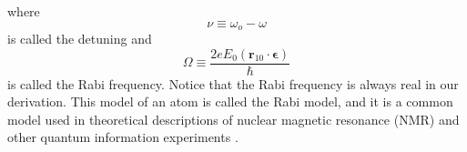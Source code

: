 where
$$
\nu \equiv \omega_o-\omega
$$
is called the detuning and
$$
\Omega \equiv \frac{2eE_0\left(\mathbf{r}_{10}\cdot\mathbf{\epsilon}\right)}{\hbar}
$$
is called the Rabi frequency.  Notice that the Rabi frequency is always real in our derivation.  This model of an atom is called the Rabi model, and it is a common model used in theoretical descriptions of nuclear magnetic resonance (NMR) and other quantum information experiments \cite{Mikio2008}.

